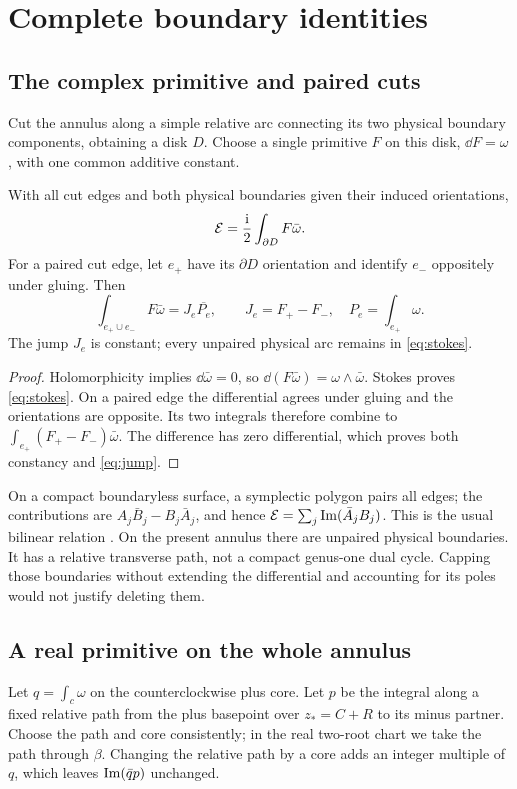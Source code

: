 \section{Complete boundary identities}\label{sec:boundary}

\subsection{The complex primitive and paired cuts}
Cut the annulus along a simple relative arc connecting its two physical
boundary components, obtaining a disk $D$. Choose a single primitive
$F$ on this disk, $\dd F=\omega$, with one common additive constant.
\begin{proposition}\label{prop:stokes}
With all cut edges and both physical boundaries given their induced
orientations,
\begin{equation}\label{eq:stokes}
 \mathcal E=\frac{\mathrm i}{2}\int_{\partial D}F\bar\omega.
\end{equation}
For a paired cut edge, let $e_+$ have its $\partial D$ orientation and
identify $e_-$ oppositely under gluing. Then
\begin{equation}\label{eq:jump}
 \int_{e_+\cup e_-}F\bar\omega
       =J_e\overline{P_e},\qquad
 J_e=F_+-F_-,\quad P_e=\int_{e_+}\omega.
\end{equation}
The jump $J_e$ is constant; every unpaired physical arc remains in
\eqref{eq:stokes}.
\end{proposition}
\begin{proof}
Holomorphicity implies $\dd\bar\omega=0$, so
$\dd(F\bar\omega)=\omega\wedge\bar\omega$. Stokes proves
\eqref{eq:stokes}. On a paired edge the differential agrees under gluing
and the orientations are opposite. Its two integrals therefore combine
to $\int_{e_+}(F_+-F_-)\bar\omega$. The difference has zero differential,
which proves both constancy and \eqref{eq:jump}.
\end{proof}

On a compact boundaryless surface, a symplectic polygon pairs all edges;
the contributions are $A_j\bar B_j-B_j\bar A_j$, and hence
$\mathcal E=\sum_j\operatorname{Im}(\bar A_jB_j)$. This is the usual bilinear relation
\cite[Section 3.1.2]{Grava}. On the present annulus there are unpaired
physical boundaries. It has a relative transverse path, not a compact
genus-one dual cycle. Capping those boundaries without extending the
differential and accounting for its poles would not justify deleting them.

\subsection{A real primitive on the whole annulus}
Let $q=\int_c\omega$ on the counterclockwise plus core. Let $p$ be the
integral along a fixed relative path from the plus basepoint over
$z_*=C+R$ to its minus partner. Choose the path and core consistently;
in the real two-root chart we take the path through $\beta$.
Changing the relative path by a core adds an integer multiple of $q$,
which leaves $\operatorname{Im}(\bar q p)$ unchanged.

